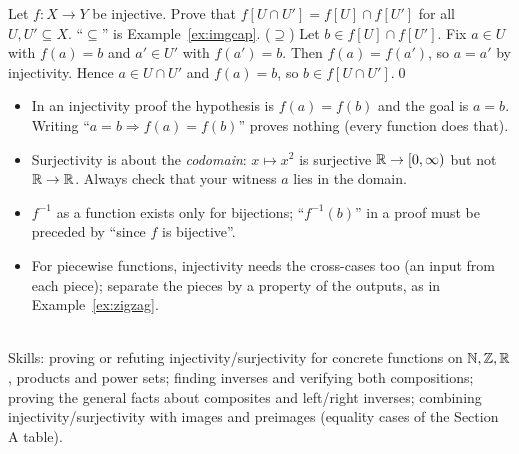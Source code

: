 \begin{hexample}
Let $f:X\to Y$ be injective. Prove that $f[U\cap U']=f[U]\cap f[U']$ for all $U,U'\subseteq X$.
\solution
``$\subseteq$'' is Example~\ref{ex:imgcap}. ($\supseteq$) Let $b\in f[U]\cap f[U']$. Fix $a\in U$ with $f(a)=b$ and $a'\in U'$ with $f(a')=b$. Then $f(a)=f(a')$, so $a=a'$ by injectivity. Hence $a\in U\cap U'$ and $f(a)=b$, so $b\in f[U\cap U']$.\qed
\end{hexample}

\begin{warn}
\begin{itemize}
\item In an injectivity proof the hypothesis is $f(a)=f(b)$ and the goal is $a=b$. Writing ``$a=b\Rightarrow f(a)=f(b)$'' proves nothing (every function does that).
\item Surjectivity is about the \emph{codomain}: $x\mapsto x^2$ is surjective $\mathbb{R}\to[0,\infty)$ but not $\mathbb{R}\to\mathbb{R}$. Always check that your witness $a$ lies in the domain.
\item $f^{-1}$ as a function exists only for bijections; ``$f^{-1}(b)$'' in a proof must be preceded by ``since $f$ is bijective''.
\item For piecewise functions, injectivity needs the cross-cases too (an input from each piece); separate the pieces by a property of the outputs, as in Example~\ref{ex:zigzag}.
\end{itemize}
\end{warn}

\begin{planning}
\quad {}\\[3pt]
Skills: proving or refuting injectivity/surjectivity for concrete functions on $\mathbb{N},\mathbb{Z},\mathbb{R}$, products and power sets; finding inverses and verifying both compositions; proving the general facts about composites and left/right inverses; combining injectivity/surjectivity with images and preimages (equality cases of the Section A table).
\end{planning}


